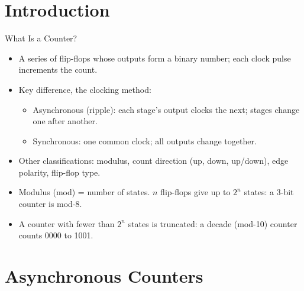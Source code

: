 \documentclass[9pt,aspectratio=169,xcolor=table]{beamer}
\begin{document}
\section{Introduction}

\begin{frame}{What Is a Counter?}
  \begin{itemize}\small\itemsep3pt
    \item A series of flip-flops whose outputs form a binary number; each clock pulse increments the count.
    \item Key difference, the clocking method:
    \begin{itemize}\small
      \item \alert{Asynchronous (ripple)}: each stage's output clocks the next; stages change one after another.
      \item \alert{Synchronous}: one common clock; all outputs change together.
    \end{itemize}
    \item Other classifications: modulus, count direction (up, down, up/down), edge polarity, flip-flop type.
    \item \alert{Modulus} (mod) = number of states. $n$ flip-flops give up to $2^n$ states: a 3-bit counter is mod-8.
    \item A counter with fewer than $2^n$ states is \alert{truncated}: a decade (mod-10) counter counts 0000 to 1001.
  \end{itemize}
\end{frame}

\section{Asynchronous Counters}
\end{document}
